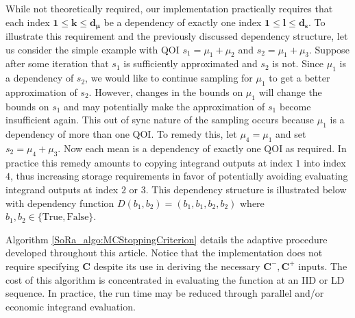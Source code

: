 \documentclass[graybox]{svmult}
\begin{document}
While not theoretically required, our implementation practically requires that each index $\boldsymbol{1} \leq \boldsymbol{k} \leq \boldsymbol{d}_{\boldsymbol{\mu}}$ be a dependency of exactly one index $\boldsymbol{1} \leq \boldsymbol{l} \leq \boldsymbol{d}_{\boldsymbol{s}}$. To illustrate this requirement and the previously discussed dependency structure, let us consider the simple example with QOI $s_1 = \mu_1 + \mu_2$ and $s_2 = \mu_1 + \mu_3$. Suppose after some iteration that $s_1$ is sufficiently approximated and $s_2$ is not. Since $\mu_1$ is a dependency of $s_2$, we would like to continue sampling for $\mu_1$ to get a better approximation of $s_2$. However, changes in the bounds on $\mu_1$ will change the bounds on $s_1$ and may potentially make the approximation of $s_1$ become insufficient again. This out of sync nature of the sampling occurs because $\mu_1$ is a dependency of more than one QOI. To remedy this, let $\mu_4 = \mu_1$ and set $s_2 = \mu_4 + \mu_3$. Now each mean is a dependency of exactly one QOI as required. In practice this remedy amounts to copying integrand outputs at index $1$ into index $4$, thus increasing storage requirements in favor of potentially avoiding evaluating integrand outputs at index $2$ or $3$. This dependency structure is illustrated below with dependency function $D(b_1,b_2) = (b_1,b_1,b_2,b_2)$ where $b_1,b_2 \in \{\text{True},\text{False}\}$. 

\begin{figure}
    \centering
{}
\end{figure}

Algorithm \ref{SoRa_algo:MCStoppingCriterion} details the adaptive procedure developed throughout this article. Notice that the implementation does not require specifying $\boldsymbol{C}$ despite its use in deriving the necessary $\boldsymbol{C}^-,\boldsymbol{C}^+$ inputs. The cost of this algorithm is concentrated in evaluating the function at an IID or LD sequence. In practice, the run time may be reduced through parallel and/or economic integrand evaluation.
\end{document}
